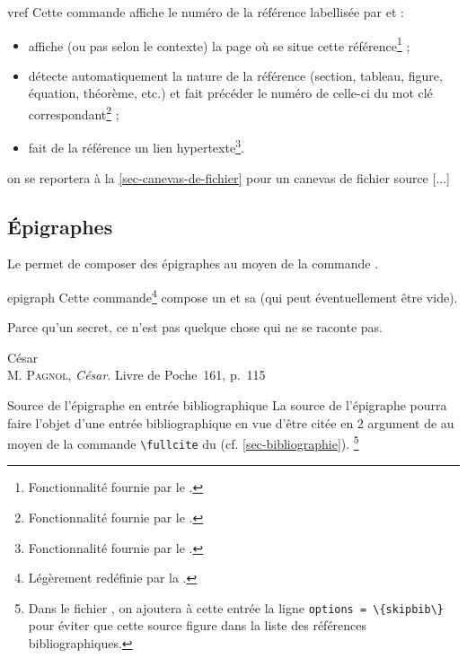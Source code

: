\begin{docCommand}{vref}{}
  Cette commande affiche le numéro de la référence labellisée par 
  et :
  \begin{itemize}
  \item affiche (ou pas selon le contexte) la page où se situe cette
    référence\footnote{Fonctionnalité fournie par le .} ;
  \item détecte automatiquement la nature de la référence (section, tableau,
    figure, équation, théorème, etc.) et fait précéder le numéro de celle-ci du
    mot clé correspondant\footnote{Fonctionnalité fournie par le
      .} ;
  \item fait de la référence un lien hypertexte\footnote{Fonctionnalité fournie
      par le .}.
  \end{itemize}
\begin{bodycode}[listing and text,listing options={deletekeywords={[2]url,[1]math}}]
[...] on se reportera à la \vref{sec-canevas-de-fichier} pour un canevas de
fichier source [...]
\end{bodycode}
\end{docCommand}

\subsection{Épigraphes}
\label{sec-epigraphes}

Le  permet de composer des épigraphes au moyen de la commande
.

\begin{docCommand}{epigraph}{}
  Cette commande\footnote{Légèrement redéfinie par la \gztauthorcl.} compose un
   et sa  (qui peut éventuellement être vide).
\end{docCommand}

\begin{bodycode}
\epigraph{%
  Parce qu'un secret, ce n'est pas quelque chose qui ne se raconte pas. \textelp{}%
}{%
  César\\M. \textsc{Pagnol}, \emph{César}. Livre de Poche~161, p.~115%
}
\end{bodycode}

\begin{dbremark}{Source de l'épigraphe en entrée bibliographique}{}
  La source de l'épigraphe pourra faire l'objet d'une entrée bibliographique en
  vue d'être citée en 2\ieme{} argument de  au moyen de la
  commande \lstinline[moretexcs={fullcite}]+\fullcite+ du 
  (cf. \vref{sec-bibliographie}).%
  \footnote{%
    Dans le fichier , on ajoutera à cette entrée la ligne
    \protect\lstinline+options = \{skipbib\}+
    pour éviter que cette source figure dans la liste des
    références bibliographiques.%
  }
\end{dbremark}

